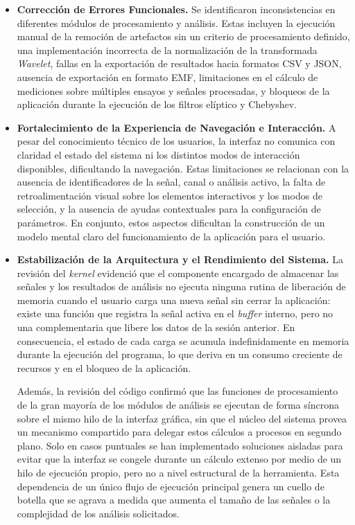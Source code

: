 \documentclass[12pt,letterpaper,oneside]{article}
\begin{document}
\begin{itemize}
  \item \textbf{Corrección de Errores Funcionales.} Se identificaron inconsistencias en diferentes módulos de procesamiento y análisis. Estas incluyen la ejecución manual de la remoción de artefactos sin un criterio de procesamiento definido, una implementación incorrecta de la normalización de la transformada \textit{Wavelet}, fallas en la exportación de resultados hacia formatos CSV y JSON, ausencia de exportación en formato EMF, limitaciones en el cálculo de mediciones sobre múltiples ensayos y señales procesadas, y bloqueos de la aplicación durante la ejecución de los filtros elíptico y Chebyshev.

  \item \textbf{Fortalecimiento de la Experiencia de Navegación e Interacción.} A pesar del conocimiento técnico de los usuarios, la interfaz no comunica con claridad el estado del sistema ni los distintos modos de interacción disponibles, dificultando la navegación. Estas limitaciones se relacionan con la ausencia de identificadores de la señal, canal o análisis activo, la falta de retroalimentación visual sobre los elementos interactivos y los modos de selección, y la ausencia de ayudas contextuales para la configuración de parámetros. En conjunto, estos aspectos dificultan la construcción de un modelo mental claro del funcionamiento de la aplicación para el usuario.

  \item \textbf{Estabilización de la Arquitectura y el Rendimiento del Sistema.} La revisión del \textit{kernel} evidenció que el componente encargado de almacenar las señales y los resultados de análisis no ejecuta ninguna rutina de liberación de memoria cuando el usuario carga una nueva señal sin cerrar la aplicación: existe una función que registra la señal activa en el \textit{buffer} interno, pero no una complementaria que libere los datos de la sesión anterior. En consecuencia, el estado de cada carga se acumula indefinidamente en memoria durante la ejecución del programa, lo que deriva en un consumo creciente de recursos y en el bloqueo de la aplicación.

  Además, la revisión del código confirmó que las funciones de procesamiento de la gran mayoría de los módulos de análisis se ejecutan de forma síncrona sobre el mismo hilo de la interfaz gráfica, sin que el núcleo del sistema provea un mecanismo compartido para delegar estos cálculos a procesos en segundo plano. Solo en casos puntuales se han implementado soluciones aisladas para evitar que la interfaz se congele durante un cálculo extenso por medio de un hilo de ejecución propio, pero no a nivel estructural de la herramienta. Esta dependencia de un único flujo de ejecución principal genera un cuello de botella que se agrava a medida que aumenta el tamaño de las señales o la complejidad de los análisis solicitados.


\end{itemize}
\end{document}
